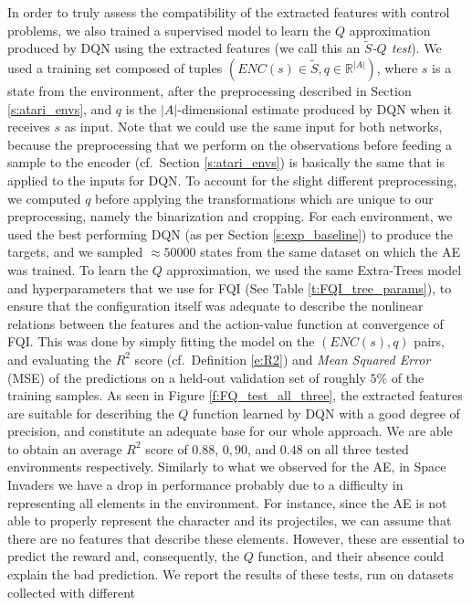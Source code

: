 In order to truly assess the compatibility of the extracted features 
with control problems, we also trained a supervised model to learn the $Q$ 
approximation produced by DQN using the extracted features (we call this 
an \textit{$\tilde{S}$-$Q$ test}). 
We used a training set composed of tuples $(ENC(s) \in \tilde{S}, q \in \mathbb{R}^{|A|})$, 
where $s$ is a state from the environment, after the preprocessing described in 
Section \ref{s:atari_envs}, and $q$ is the $|A|$-dimensional estimate produced 
by DQN when it receives $s$ as input. 
Note that we could use the same input for both networks, because the 
preprocessing that we perform on the observations before feeding a sample to the
encoder (cf.\ Section \ref{s:atari_envs}) is basically the same that is 
applied to the inputs for DQN. To account for the slight different preprocessing,
we computed $q$ before applying the transformations which are unique to our 
preprocessing, namely the binarization and cropping. 
For each environment, we used the best performing DQN (as per Section \ref{s:exp_baseline}) 
to produce the targets, and we sampled $\approx50000$ states from the same 
dataset on which the AE was trained.
To learn the $Q$ approximation, we used the same Extra-Trees model and 
hyperparameters that we use for FQI (See Table \ref{t:FQI_tree_params}), to 
ensure that the configuration itself was adequate to describe the nonlinear 
relations between the features and the action-value function at convergence of 
FQI. 
This was done by simply fitting the model on the $(ENC(s), q)$ pairs, and 
evaluating the $R^2$ score (cf.\ Definition \eqref{e:R2}) and \textit{Mean 
Squared Error} (MSE) of the predictions on a held-out validation set of roughly 
$5\%$ of the training samples.
As seen in Figure \ref{f:FQ_test_all_three}, the extracted features are suitable
for describing the $Q$ function learned by DQN with a good degree of precision, 
and constitute an adequate base for our whole approach. 
We are able to obtain an average $R^2$ score of $0.88$, $0,90$, and $0.48$ on 
all three tested environments respectively.
Similarly to what we observed for the AE, in Space Invaders we have a drop in 
performance probably due to a difficulty in representing all elements in 
the environment. For instance, since the AE is not able to properly represent 
the character and its projectiles, we can assume that there are no features that
describe these elements. However, these are essential to predict the reward 
and, consequently, the $Q$ function, and their absence could explain the bad
prediction.
We report the results of these tests, run on datasets collected with different
